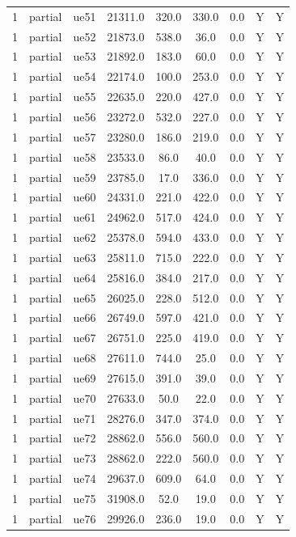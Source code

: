 \begin{table}[ht]
\begin{tabular}{|c|c|c|c|c|c|c|c|c|}
1 & partial & ue51 & 21311.0 & 320.0 & 330.0 & 0.0 & Y & Y \\
1 & partial & ue52 & 21873.0 & 538.0 & 36.0 & 0.0 & Y & Y \\
1 & partial & ue53 & 21892.0 & 183.0 & 60.0 & 0.0 & Y & Y \\
1 & partial & ue54 & 22174.0 & 100.0 & 253.0 & 0.0 & Y & Y \\
1 & partial & ue55 & 22635.0 & 220.0 & 427.0 & 0.0 & Y & Y \\
1 & partial & ue56 & 23272.0 & 532.0 & 227.0 & 0.0 & Y & Y \\
1 & partial & ue57 & 23280.0 & 186.0 & 219.0 & 0.0 & Y & Y \\
1 & partial & ue58 & 23533.0 & 86.0 & 40.0 & 0.0 & Y & Y \\
1 & partial & ue59 & 23785.0 & 17.0 & 336.0 & 0.0 & Y & Y \\
1 & partial & ue60 & 24331.0 & 221.0 & 422.0 & 0.0 & Y & Y \\
1 & partial & ue61 & 24962.0 & 517.0 & 424.0 & 0.0 & Y & Y \\
1 & partial & ue62 & 25378.0 & 594.0 & 433.0 & 0.0 & Y & Y \\
1 & partial & ue63 & 25811.0 & 715.0 & 222.0 & 0.0 & Y & Y \\
1 & partial & ue64 & 25816.0 & 384.0 & 217.0 & 0.0 & Y & Y \\
1 & partial & ue65 & 26025.0 & 228.0 & 512.0 & 0.0 & Y & Y \\
1 & partial & ue66 & 26749.0 & 597.0 & 421.0 & 0.0 & Y & Y \\
1 & partial & ue67 & 26751.0 & 225.0 & 419.0 & 0.0 & Y & Y \\
1 & partial & ue68 & 27611.0 & 744.0 & 25.0 & 0.0 & Y & Y \\
1 & partial & ue69 & 27615.0 & 391.0 & 39.0 & 0.0 & Y & Y \\
1 & partial & ue70 & 27633.0 & 50.0 & 22.0 & 0.0 & Y & Y \\
1 & partial & ue71 & 28276.0 & 347.0 & 374.0 & 0.0 & Y & Y \\
1 & partial & ue72 & 28862.0 & 556.0 & 560.0 & 0.0 & Y & Y \\
1 & partial & ue73 & 28862.0 & 222.0 & 560.0 & 0.0 & Y & Y \\
1 & partial & ue74 & 29637.0 & 609.0 & 64.0 & 0.0 & Y & Y \\
1 & partial & ue75 & 31908.0 & 52.0 & 19.0 & 0.0 & Y & Y \\
1 & partial & ue76 & 29926.0 & 236.0 & 19.0 & 0.0 & Y & Y \\

\end{tabular}
\end{table}
